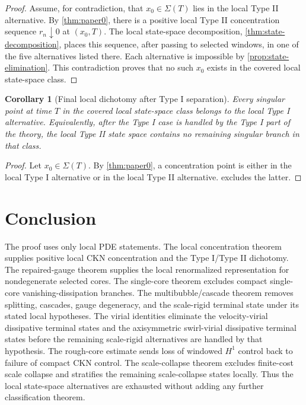\documentclass[11pt]{amsart}
\theoremstyle{plain}
\newtheorem{corollary}[theorem]{Corollary}
\theoremstyle{definition}
\theoremstyle{remark}
\begin{document}
\begin{proof}
Assume, for contradiction, that \(x_0\in\Sigma(T)\) lies in the local Type II
alternative.  By \cref{thm:paper0}, there is a positive local Type II
concentration sequence \(r_n\downarrow0\) at \((x_0,T)\).  The local
state-space decomposition, \cref{thm:state-decomposition}, places this sequence,
after passing to selected windows, in one of the five alternatives listed
there.  Each alternative is impossible by \cref{prop:state-elimination}.  This
contradiction proves that no such \(x_0\) exists in the covered local
state-space class.
\end{proof}

\begin{corollary}[Final local dichotomy after Type I separation]
\label{cor:final-local-dichotomy}
Every singular point at time \(T\) in the covered local state-space class
belongs to the local Type I alternative.  Equivalently, after the Type I case is
handled by the Type I part of the theory, the local Type II state space contains
no remaining singular branch in that class.
\end{corollary}

\begin{proof}
Let \(x_0\in\Sigma(T)\).  By \cref{thm:paper0}, a concentration point is
either in the local Type I alternative or in the local Type II alternative.
 excludes the latter.
\end{proof}

\section{Conclusion}

The proof uses only local PDE statements.  The local concentration theorem
supplies positive local CKN concentration and the Type I/Type II dichotomy.  The
repaired-gauge theorem supplies the local renormalized representation for
nondegenerate selected cores.  The single-core theorem excludes compact
single-core vanishing-dissipation branches.  The multibubble/cascade theorem
removes splitting, cascades, gauge degeneracy, and the scale-rigid terminal
state under its stated local hypotheses.  The virial identities eliminate the
velocity-virial dissipative terminal states and the axisymmetric
swirl-virial dissipative terminal states before the remaining scale-rigid
alternatives are handled by that hypothesis.  The rough-core estimate sends loss
of windowed \(H^1\) control back to failure of compact CKN control.  The
scale-collapse theorem excludes finite-cost scale collapse and stratifies the
remaining scale-collapse states locally.  Thus the local state-space
alternatives are exhausted without adding any further classification theorem.
\end{document}
